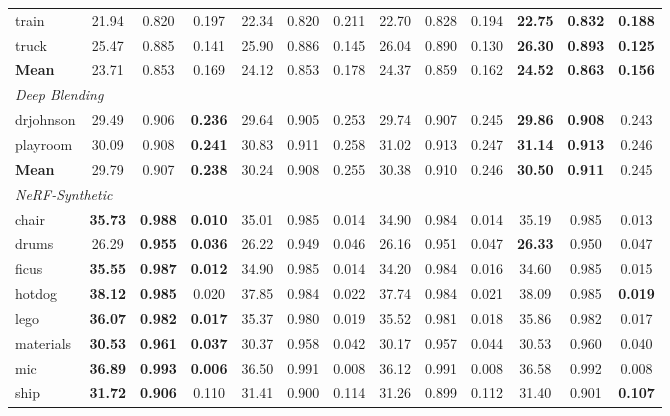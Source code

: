 \begin{table}[t]
{\begin{tabular}{lcccccccccccc}
train & 21.94 & 0.820 & 0.197 & 22.34 & 0.820 & 0.211 & 22.70 & 0.828 & 0.194 & \textbf{22.75} & \textbf{0.832} & \textbf{0.188} \\
truck & 25.47 & 0.885 & 0.141 & 25.90 & 0.886 & 0.145 & 26.04 & 0.890 & 0.130 & \textbf{26.30} & \textbf{0.893} & \textbf{0.125} \\
\textbf{Mean} & 23.71 & 0.853 & 0.169 & 24.12 & 0.853 & 0.178 & 24.37 & 0.859 & 0.162 & \textbf{24.52} & \textbf{0.863} & \textbf{0.156} \\
\midrule
\multicolumn{13}{l}{\textit{Deep Blending}} \\
drjohnson & 29.49 & 0.906 & \textbf{0.236} & 29.64 & 0.905 & 0.253 & 29.74 & 0.907 & 0.245 & \textbf{29.86} & \textbf{0.908} & 0.243 \\
playroom & 30.09 & 0.908 & \textbf{0.241} & 30.83 & 0.911 & 0.258 & 31.02 & 0.913 & 0.247 & \textbf{31.14} & \textbf{0.913} & 0.246 \\
\textbf{Mean} & 29.79 & 0.907 & \textbf{0.238} & 30.24 & 0.908 & 0.255 & 30.38 & 0.910 & 0.246 & \textbf{30.50} & \textbf{0.911} & 0.245 \\
\midrule
\multicolumn{13}{l}{\textit{NeRF-Synthetic}} \\
chair & \textbf{35.73} & \textbf{0.988} & \textbf{0.010} & 35.01 & 0.985 & 0.014 & 34.90 & 0.984 & 0.014 & 35.19 & 0.985 & 0.013 \\
drums & 26.29 & \textbf{0.955} & \textbf{0.036} & 26.22 & 0.949 & 0.046 & 26.16 & 0.951 & 0.047 & \textbf{26.33} & 0.950 & 0.047 \\
ficus & \textbf{35.55} & \textbf{0.987} & \textbf{0.012} & 34.90 & 0.985 & 0.014 & 34.20 & 0.984 & 0.016 & 34.60 & 0.985 & 0.015 \\
hotdog & \textbf{38.12} & \textbf{0.985} & 0.020 & 37.85 & 0.984 & 0.022 & 37.74 & 0.984 & 0.021 & 38.09 & 0.985 & \textbf{0.019} \\
lego & \textbf{36.07} & \textbf{0.982} & \textbf{0.017} & 35.37 & 0.980 & 0.019 & 35.52 & 0.981 & 0.018 & 35.86 & 0.982 & 0.017 \\
materials & \textbf{30.53} & \textbf{0.961} & \textbf{0.037} & 30.37 & 0.958 & 0.042 & 30.17 & 0.957 & 0.044 & 30.53 & 0.960 & 0.040 \\
mic & \textbf{36.89} & \textbf{0.993} & \textbf{0.006} & 36.50 & 0.991 & 0.008 & 36.12 & 0.991 & 0.008 & 36.58 & 0.992 & 0.008 \\
ship & \textbf{31.72} & \textbf{0.906} & 0.110 & 31.41 & 0.900 & 0.114 & 31.26 & 0.899 & 0.112 & 31.40 & 0.901 & \textbf{0.107} \\

\end{tabular}}
\end{table}
